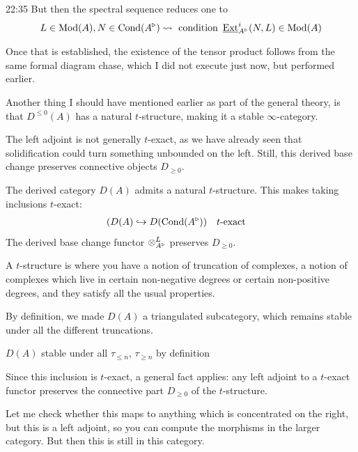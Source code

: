 \begin{unfinished}{22:35}
But then the spectral sequence reduces one to 
\begin{align*}
L \in \operatorname{Mod}(A), N \in \mathrm{Cond}(A^\triangleright) \leadsto \text{ condition } \operatorname{\underline{Ext}}^i_{A^\triangleright}(N,L) \in \operatorname{Mod}(A)
\end{align*}

Once that is established, the existence of the tensor product follows from the same formal diagram chase, which I did not execute just now, but performed earlier.


Another thing I should have mentioned earlier as part of the general theory, is that $D^{\leq 0}(A)$ has a natural $t$-structure, making it a stable $\infty$-category.

The left adjoint is not generally $t$-exact, as we have already seen that solidification could turn something unbounded on the left. Still, this derived base change preserves connective objects $D_{\geq 0}$.

\bp
The derived category $D(A)$ admits a natural $t$-structure. This makes taking inclusions $t$-exact:
\begin{align*}
(D(A) \hookrightarrow D(\mathrm{Cond}(A^\triangleright)) \quad & \text{$t$-exact}
\end{align*}
The derived base change functor $\otimes^L_{A^\triangleright}$ preserves $D_{\geq 0}$.
\ep

A $t$-structure is where you have a notion of truncation of complexes, a notion of complexes which live in certain non-negative degrees or certain non-positive degrees, and they satisfy all the usual properties. 

\begin{sketch}

By definition, we made $D(A)$  a triangulated subcategory, which remains stable under all the different truncations.

$D(A)$ stable under all $\tau_{\leq n}$, $\tau_{\geq n}$ by definition

Since this inclusion  is $t$-exact, a general fact applies: any left adjoint to a $t$-exact functor preserves the connective part $D_{\geq 0}$ of the $t$-structure.

\end{sketch}

Let me check whether this maps to anything which is concentrated on the right, but this is a left adjoint, so you can compute the morphisms in the larger category. But then this  is still in this category.



\end{unfinished}
